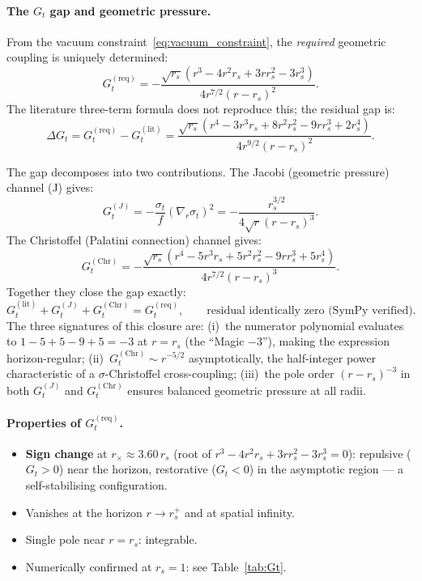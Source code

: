 \documentclass[11pt,a4paper]{article}
\theoremstyle{plain}
\theoremstyle{definition}
\theoremstyle{remark}
\newcommand{\sigt}{\sigma_t}
\newcommand{\rs}{r_s}
\begin{document}
\paragraph{The $G_t$ gap and geometric pressure.}
From the vacuum constraint~\eqref{eq:vacuum_constraint}, the \emph{required} geometric
coupling is uniquely determined:
\begin{equation}
  G_t^{(\mathrm{req})}
  = -\frac{\sqrt{\rs}(r^3 - 4r^2\rs + 3r\rs^2 - 3\rs^3)}{4r^{7/2}(r-\rs)^2}.
  \label{eq:Greq}
\end{equation}
The literature three-term formula does not reproduce this; the residual gap is:
\begin{equation}
  \Delta G_t = G_t^{(\mathrm{req})} - G_t^{(\mathrm{lit})}
  = \frac{\sqrt{\rs}(r^4-3r^3\rs+8r^2\rs^2-9r\rs^3+2\rs^4)}
         {4r^{9/2}(r-\rs)^2}.
  \label{eq:Ggap}
\end{equation}

The gap decomposes into two contributions.  The Jacobi (geometric pressure) channel (J)
gives:
\begin{equation}
  G_t^{(J)} = -\frac{\sigt}{f}(\nabla_r\sigt)^2
  = -\frac{\rs^{3/2}}{4\sqrt{r}(r-\rs)^3}.
  \label{eq:GtJ}
\end{equation}
The Christoffel (Palatini connection) channel gives:
\begin{equation}
  G_t^{(\mathrm{Chr})} = -\frac{\sqrt{\rs}(r^4-5r^3\rs+5r^2\rs^2-9r\rs^3+5\rs^4)}
                               {4r^{7/2}(r-\rs)^3}.
  \label{eq:GtChr}
\end{equation}
Together they close the gap exactly:
\begin{equation}
  G_t^{(\mathrm{lit})} + G_t^{(J)} + G_t^{(\mathrm{Chr})} = G_t^{(\mathrm{req})},
  \qquad \text{residual identically zero (SymPy verified).}
  \label{eq:Gt_closure}
\end{equation}
The three signatures of this closure are: (i)~the numerator polynomial evaluates to
$1-5+5-9+5=-3$ at $r=\rs$ (the ``Magic $-3$''), making the expression horizon-regular;
(ii)~$G_t^{(\mathrm{Chr})} \sim r^{-5/2}$ asymptotically, the half-integer power
characteristic of a $\sigma$-Christoffel cross-coupling; (iii)~the pole order
$(r-\rs)^{-3}$ in both $G_t^{(J)}$ and $G_t^{(\mathrm{Chr})}$ ensures balanced
geometric pressure at all radii.

\paragraph{Properties of $G_t^{(\mathrm{req})}$.}
\begin{itemize}[nosep]
  \item \textbf{Sign change} at $r_\times \approx 3.60\,\rs$
    (root of $r^3 - 4r^2\rs + 3r\rs^2 - 3\rs^3 = 0$):
    repulsive ($G_t > 0$) near the horizon, restorative ($G_t < 0$) in the
    asymptotic region --- a self-stabilising configuration.
  \item Vanishes at the horizon $r \to \rs^+$ and at spatial infinity.
  \item Single pole near $r = \rs$: integrable.
  \item Numerically confirmed at $\rs = 1$: see Table~\ref{tab:Gt}.
\end{itemize}
\end{document}
